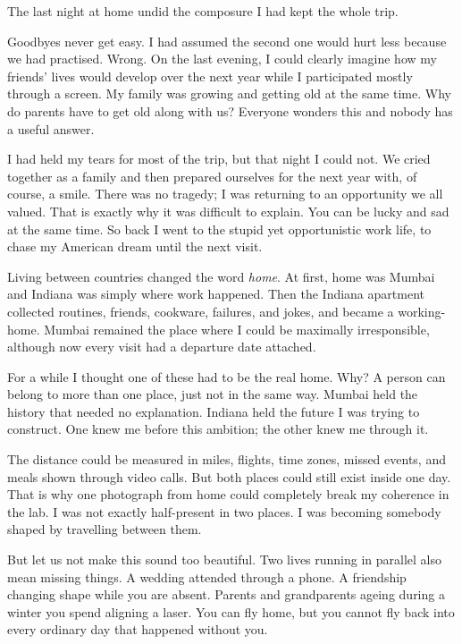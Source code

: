 \documentclass[11pt,twoside,openany]{book}
\newcommand{\scene}{\par\vspace{0.7em}{\centering\color{accent}\rule{0.85cm}{0.6pt}\par}\vspace{0.5em}\noindent\ignorespaces}
\begin{document}
\scene

The last night at home undid the composure I had kept the whole trip.

Goodbyes never get easy. I had assumed the second one would hurt less because
we had practised. Wrong. On the last evening, I could clearly imagine how my
friends' lives would develop over the next year while I participated mostly
through a screen. My family was growing and getting old at the same time. Why
do parents have to get old along with us? Everyone wonders this and nobody has
a useful answer.

I had held my tears for most of the trip, but that night I could not. We cried
together as a family and then prepared ourselves for the next year with, of
course, a smile. There was no tragedy; I was returning to an opportunity we
all valued. That is exactly why it was difficult to explain. You can be lucky
and sad at the same time. So back I went to the stupid yet opportunistic work
life, to chase my American dream until the next visit.

\scene

Living between countries changed the word \textit{home}. At first, home was
Mumbai and Indiana was simply where work happened. Then the Indiana apartment
collected routines, friends, cookware, failures, and jokes, and became a
working-home. Mumbai remained the place where I could be maximally
irresponsible, although now every visit had a departure date attached.

For a while I thought one of these had to be the real home. Why? A person can
belong to more than one place, just not in the same way. Mumbai held the
history that needed no explanation. Indiana held the future I was trying to
construct. One knew me before this ambition; the other knew me through it.

The distance could be measured in miles, flights, time zones, missed events,
and meals shown through video calls. But both places could still exist inside
one day. That is why one photograph from home could completely break my
coherence in the lab. I was not exactly half-present in two places. I was
becoming somebody shaped by travelling between them.

But let us not make this sound too beautiful. Two lives running in parallel
also mean missing things. A wedding attended through a phone. A friendship
changing shape while you are absent. Parents and grandparents ageing during a
winter you spend aligning a laser. You can fly home, but you cannot fly back
into every ordinary day that happened without you.
\end{document}
